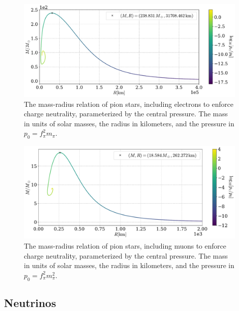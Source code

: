 \begin{figure}[H]
    \centering
    \includegraphics[width=.85\textwidth]{../scripts/figurer/pion_star/mass_radius__e.pdf}
    \caption{
        The mass-radius relation of pion stars, including electrons to enforce charge neutrality, parameterized by the central pressure.
        The mass in units of solar masses, the radius in kilometers, and the pressure in $p_0 = f_\pi^2 m_\pi$.
        }
        \label{fig: mass-radius relation with electrons}
\end{figure}

\begin{figure}[H]
    \centering
    \includegraphics[width=.85\textwidth]{../scripts/figurer/pion_star/mass_radius__mu.pdf}
    \caption{
        The mass-radius relation of pion stars, including muons to enforce charge neutrality, parameterized by the central pressure.
        The mass in units of solar masses, the radius in kilometers, and the pressure in $p_0 = f_\pi^2 m_\pi^2$.
        }
        \label{fig: mass-radius relation with muons}
\end{figure}




\subsection{Neutrinos}

